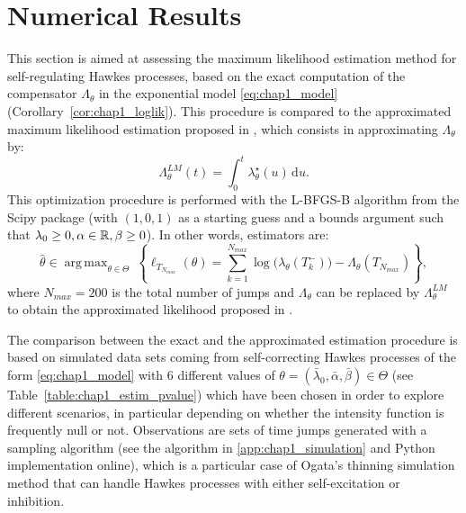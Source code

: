 \section{Numerical Results}\label{sec:chap1_num_res}

This section is aimed at assessing the maximum likelihood estimation method for self-regulating Hawkes processes, based on the exact computation of the compensator \(\Lambda_\theta\) in the exponential model \eqref{eq:chap1_model} (Corollary~\ref{cor:chap1_loglik}).
This procedure is compared to the approximated maximum likelihood estimation proposed in \textcite{Lemonnier2014}, which consists in approximating $\Lambda_\theta$ by:
\[
  \Lambda_\theta^{LM}(t) = \int_{0}^{t}{\lambda_\theta^\star(u)\,\mathrm{d}u}.
\]
This optimization procedure is performed with the L-BFGS-B algorithm from the Scipy package (with $(1,0,1)$ as a starting guess and a bounds argument such that $\lambda_0 \geq 0, \alpha \in {\mathbb R}, \beta\geq 0$).
In other words, estimators are:
\[
  \hat \theta \in \operatorname{arg\,max}_{\theta \in \Theta} ~
  \left\{ \ell_{T_{N_{max}}}(\theta)
  =
  \sum_{k=1}^{N_{max}}{\log{(\lambda_\theta(T_k^-)})} - \Lambda_\theta(T_{N_{max}}) \right\},
\]
where
\(N_{max}=200\) is the total number of jumps
and \(\Lambda_\theta\) can be replaced by \(\Lambda_\theta^{LM}\) to obtain the approximated likelihood proposed in \textcite{Lemonnier2014}.

The comparison between the exact and the approximated estimation procedure is based on simulated data sets coming from self-correcting Hawkes processes of the form \eqref{eq:chap1_model} with 6 different values of \(\theta = (\bar \lambda_0, \bar \alpha, \bar \beta) \in \Theta\) (see Table~\ref{table:chap1_estim_pvalue}) which have been chosen in order to explore different scenarios, in particular depending on whether the intensity function is frequently null or not.
Observations are sets of time jumps generated with a sampling algorithm (see the algorithm in \ref{app:chap1_simulation} and Python implementation online), which is a particular case of Ogata's thinning simulation method \parencite{Ogata1981} that can handle Hawkes processes with either self-excitation or inhibition.


